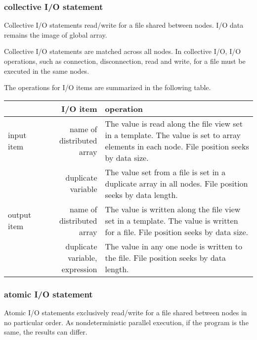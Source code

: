    \subsubsection{collective I/O statement}

   Collective I/O statements read/write for a file shared between nodes.
   I/O data remains the image of global array.

   Collective I/O statements are matched across all nodes.
   In collective I/O, I/O operations, such as connection, disconnection,
   read and write, for a file must be executed in the same nodes. 
   
   The operations for I/O items are summarized in the following table.

   \begin{table}[h]
    \begin{center}
     \begin{tabular}{|l|r|p{80mm}|}
      \hline
      \multicolumn{1}{|c}{ }  & {\bf I/O item} & {\bf operation} \\ \hline
      input item & name of distributed array & The value is read along
	      the file view set in a template. The value is set to array
	      elements in each node.
	      File position seeks by data size.\\
      \cline{2-3}
      & duplicate variable &  The value set from a file is set in a
	      duplicate array in all nodes. File position seeks by
	      data length. \\ \hline
      output item & name of distributed array & The value is written
	      along the file view set in a template. The value is
	      written for a file.
	      File position seeks by data size.\\
      \cline{2-3}
      & duplicate variable, expression & The value in any one node is
	      written to the file.  File position seeks by data
	      length. \\ \hline
      \end{tabular}
     \end{center}
    \label{tb:aaa}
   \end{table}

   \subsubsection{atomic I/O statement}

   Atomic I/O statements exclusively read/write for a file shared
   between nodes in no particular order.
   As nondeterministic parallel execution, if the program is the same,
   the results can differ.

